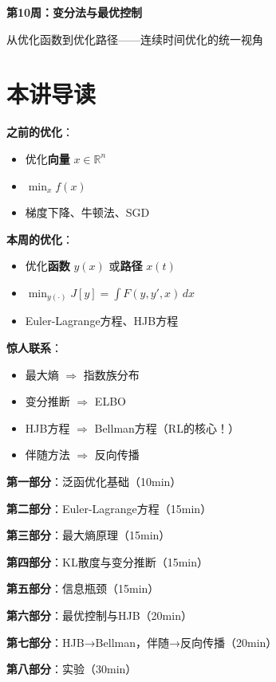 \documentclass[12pt, a4paper]{ctexart}
\begin{document}
\begin{center}
{\LARGE\bfseries 第10周：变分法与最优控制}

\vspace{0.5cm}
{\large 从优化函数到优化路径——连续时间优化的统一视角}
\end{center}

\tableofcontents
\newpage

\section*{本讲导读}

\begin{blackboard}[本周的核心洞察]

\textbf{之前的优化}：
\begin{itemize}
    \item 优化\textbf{向量} $x \in \mathbb{R}^n$
    \item $\min_x f(x)$
    \item 梯度下降、牛顿法、SGD
\end{itemize}

\textbf{本周的优化}：
\begin{itemize}
    \item 优化\textbf{函数} $y(x)$ 或\textbf{路径} $x(t)$
    \item $\min_{y(\cdot)} J[y] = \int F(y, y', x) \, dx$
    \item Euler-Lagrange方程、HJB方程
\end{itemize}

\textbf{惊人联系}：
\begin{itemize}
    \item 最大熵 $\Rightarrow$ 指数族分布
    \item 变分推断 $\Rightarrow$ ELBO
    \item HJB方程 $\Rightarrow$ Bellman方程（RL的核心！）
    \item 伴随方法 $\Rightarrow$ 反向传播
\end{itemize}

\end{blackboard}

\begin{blackboard}[内容结构]

\textbf{第一部分}：泛函优化基础（10min）

\textbf{第二部分}：Euler-Lagrange方程（15min）

\textbf{第三部分}：最大熵原理（15min）

\textbf{第四部分}：KL散度与变分推断（15min）

\textbf{第五部分}：信息瓶颈（15min）

\textbf{第六部分}：最优控制与HJB（20min）

\textbf{第七部分}：HJB→Bellman，伴随→反向传播（20min）

\textbf{第八部分}：实验（30min）

\end{blackboard}
\end{document}
